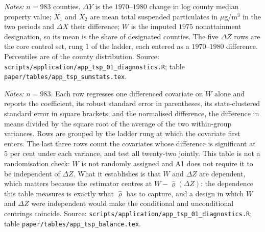 \documentclass[
  12pt]{article}
\newcommand{\1}[1]{\mathds{1}\left[#1\right]}
\theoremstyle{plain}
\theoremstyle{definition}
\theoremstyle{definition}
\theoremstyle{remark}
\begin{document}
\begin{table}[!htbp]
\centering
\begin{threeparttable}
\caption{Descriptive statistics}
\label{tab:supp-app-sumstats}
\footnotesize

\begin{tablenotes}\footnotesize
\item \textit{Notes:} $n=983$ counties. $\Delta Y$ is the $1970$--$1980$ change
in log county median property value; $X_1$ and $X_2$ are mean total suspended
particulates in $\mu$g/m$^3$ in the two periods and $\Delta X$ their difference;
$W$ is the imputed $1975$ nonattainment designation, so its mean is the share of
designated counties. The five $\Delta Z$ rows are the core control set, rung 1
of the ladder, each entered as a $1970$--$1980$ difference. Percentiles are of
the county distribution. Source:
\texttt{scripts/application/app\_tsp\_01\_diagnostics.R}; table
\texttt{paper/tables/app\_tsp\_sumstats.tex}.
\end{tablenotes}
\end{threeparttable}
\end{table}

\begin{table}[!htbp]
\centering
\begin{threeparttable}
\caption{Balance of the twenty-two differenced covariates on the instrument}
\label{tab:supp-app-balance}
\footnotesize

\begin{tablenotes}\footnotesize
\item \textit{Notes:} $n=983$. Each row regresses one differenced covariate on
$W$ alone and reports the coefficient, its robust standard error in parentheses,
its state-clustered standard error in square brackets, and the normalised
difference, the difference in means divided by the square root of the average of
the two within-group variances. Rows are grouped by the ladder rung at which the
covariate first enters. The last three rows count the covariates whose
difference is significant at $5$ per cent under each variance, and test all
twenty-two jointly. This table is not a randomisation check: $W$ is not
randomly assigned and A1 does not require it to be independent of $\Delta Z$.
What it establishes is that $W$ and $\Delta Z$ are dependent, which matters
because the estimator centres at $W-\hat\varrho(\Delta Z)$: the dependence this
table measures is exactly what $\hat\varrho$ has to capture, and a design in
which $W$ and $\Delta Z$ were independent would make the conditional and
unconditional centrings coincide. Source:
\texttt{scripts/application/app\_tsp\_01\_diagnostics.R}; table
\texttt{paper/tables/app\_tsp\_balance.tex}.
\end{tablenotes}
\end{threeparttable}
\end{table}
\end{document}
